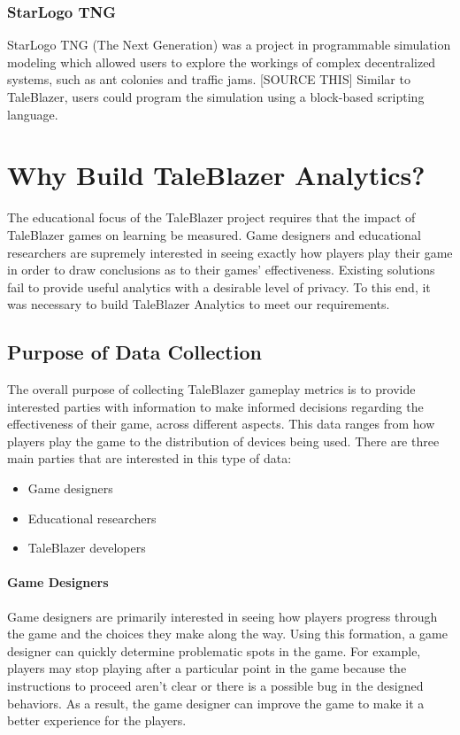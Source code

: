 \subsubsection{StarLogo TNG}

StarLogo TNG (The Next Generation) was a project in programmable simulation modeling which allowed users to explore the workings of complex decentralized systems, such as ant colonies and traffic jams. [SOURCE THIS] Similar to TaleBlazer, users could program the simulation using a block-based scripting language. 

\section{Why Build TaleBlazer Analytics?}

The educational focus of the TaleBlazer project requires that the impact of TaleBlazer games on learning be measured. Game designers and educational researchers are supremely interested in seeing exactly how players play their game in order to draw conclusions as to their games' effectiveness. Existing solutions fail to provide useful analytics with a desirable level of privacy. To this end, it was necessary to build TaleBlazer Analytics to meet our requirements. 

\subsection{Purpose of Data Collection}

The overall purpose of collecting TaleBlazer gameplay metrics is to provide interested parties with information to make informed decisions regarding the effectiveness of their game, across different aspects. This data ranges from how players play the game to the distribution of devices being used. There are three main parties that are interested in this type of data: 
	\begin{itemize}
		\item Game designers
		\item Educational researchers
		\item TaleBlazer developers
	\end{itemize}

\paragraph{Game Designers}
Game designers are primarily interested in seeing how players progress through the game and the choices they make along the way. Using this formation, a game designer can quickly determine problematic spots in the game. For example, players may stop playing after a particular point in the game because the instructions to proceed aren't clear or there is a possible bug in the designed behaviors. As a result, the game designer can improve the game to make it a better experience for the players.

